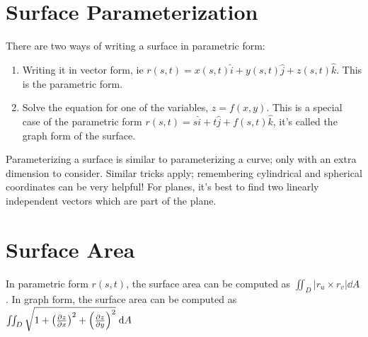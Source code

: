 \documentclass[letterpaper,11pt]{article}
\begin{document}
\section*{Surface Parameterization}
There are two ways of writing a surface in parametric form:
\begin{enumerate}
\item Writing it in vector form, ie $r(s, t) = x(s, t) \hat{i} + y(s, t) \hat{j} + z(s, t) \hat{k}$. This is the parametric form.
\item Solve the equation for one of the variables, $z = f(x, y)$.
  This is a special case of the parametric form $r(s, t) = s \hat{i} + t \hat{j} + f(s, t) \hat{k}$, it's called the graph form of the surface.
\end{enumerate}
Parameterizing a surface is similar to parameterizing a curve; only with an extra dimension to consider.
Similar tricks apply; remembering cylindrical and spherical coordinates can be very helpful!
For planes, it's best to find two linearly independent vectors which are part of the plane.

\section*{Surface Area}
In parametric form $r(s, t)$, the surface area can be computed as $\iint_D |r_u \times r_v| \dd{A}$.
In graph form, the surface area can be computed as $\iint_D \sqrt{1 + \left(\frac{\partial z}{\partial x}\right)^2 + \left(\frac{\partial z}{\partial y}\right)^2} \;\mathrm{d}A$
\end{document}
